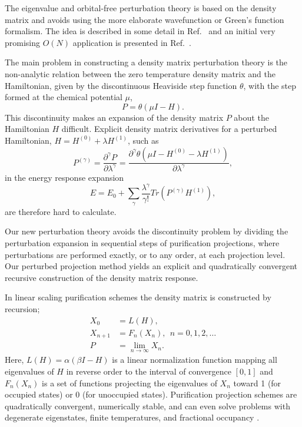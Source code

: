 The eigenvalue and orbital-free perturbation theory is based on the density 
matrix and avoids using the more elaborate wavefunction or Green's function 
formalism. The idea is described in some detail in Ref.\ \cite{NiklassonPRT}
and an initial very promising $O(N)$ application is presented in Ref.\ \cite{Weber04}.

The main problem in constructing a density matrix perturbation theory is 
the non-analytic relation between the zero temperature density matrix and 
the Hamiltonian, given by the discontinuous Heaviside step function $\theta$,
with the step formed at the chemical potential $\mu$,
\begin{equation} \label{DM}
P = \theta(\mu I -  H).
\end{equation}
This discontinuity makes an expansion of the density matrix $P$ about 
the Hamiltonian $H$ difficult.
Explicit density matrix derivatives for a perturbed Hamiltonian,
$H = H^{(0)} + \lambda H^{(1)}$, such as
\begin{equation}
P^{(\gamma)} = \frac{\partial^\gamma P}{\partial \lambda^\gamma} = 
\frac{\partial^\gamma \theta(\mu I - H^{(0)} - \lambda H^{(1)})}{\partial \lambda^\gamma},
\end{equation}
in the energy response expansion
\begin{equation}
E = E_0 + \sum_{\gamma} \frac{\lambda^{\gamma}}{\gamma !}Tr(P^{(\gamma)} H^{(1)}),
\end{equation} 
are therefore hard to calculate.

Our new perturbation theory avoids the
discontinuity problem by dividing the perturbation expansion
in sequential steps of purification projections, where perturbations
are performed exactly, or to any order, at each projection level.
Our perturbed projection method yields an explicit and quadratically 
convergent recursive construction of the density matrix response.

In linear scaling purification schemes 
the density matrix is constructed by recursion;
\begin{equation}\label{DM_EXP} \begin{array}{ll}
X_0     & = L(H), \\
X_{n+1} & = F_n(X_n), ~~ n = 0,1,2, \ldots\\
P    & = \lim_{n \rightarrow \infty} X_n. \end{array}
\end{equation}
Here, $L(H) = \alpha(\beta I - H)$ is a linear normalization function 
mapping all eigenvalues of $H$
in reverse order to the interval of convergence $[0,1]$ and $F_{n}(X_n)$ 
is a set of functions projecting the eigenvalues of $X_n$
toward  1 (for occupied states) or 0 (for unoccupied states). 
Purification projection schemes are quadratically convergent, numerically
stable, and can even solve problems with degenerate eigenstates, finite
temperatures, and fractional occupancy \cite{NiklassonSP2,NiklassonSP4,NiklassonIP}.

